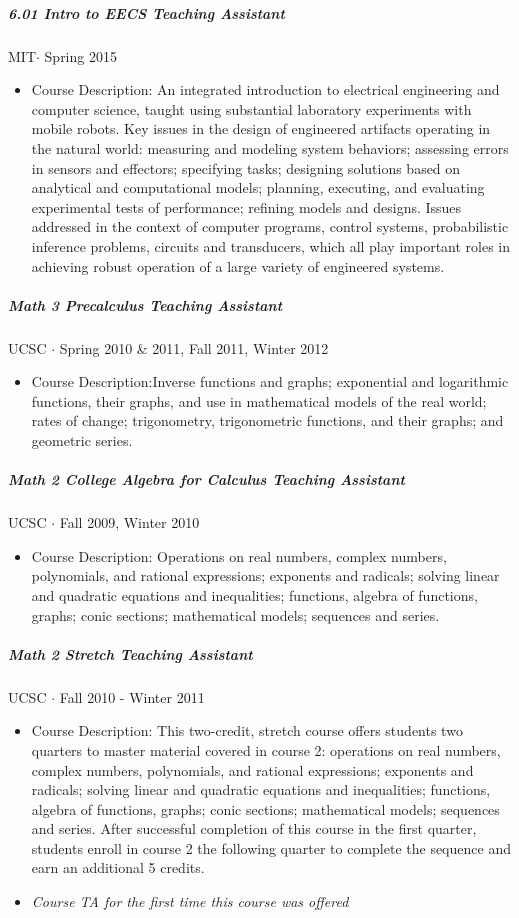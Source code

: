 \documentclass[10pt,letterpaper]{article}
\begin{document}
\subparagraph{6.01 Intro to EECS Teaching Assistant}
MIT$\cdot$ Spring 2015
\begin{itemize}
\item Course Description: An integrated introduction to electrical engineering and computer science, taught using substantial laboratory experiments with mobile robots. Key issues in the design of engineered artifacts operating in the natural world: measuring and modeling system behaviors; assessing errors in sensors and effectors; specifying tasks; designing solutions based on analytical and computational models; planning, executing, and evaluating experimental tests of performance; refining models and designs. Issues addressed in the context of computer programs, control systems, probabilistic inference problems, circuits and transducers, which all play important roles in achieving robust operation of a large variety of engineered systems.
\end{itemize}
\subparagraph{Math 3 Precalculus  Teaching Assistant}
UCSC $\cdot$ Spring 2010 \& 2011, Fall 2011, Winter 2012
\begin{itemize}
\item Course Description:Inverse functions and graphs; exponential and logarithmic functions, their graphs, and use in mathematical models of the real world; rates of change; trigonometry, trigonometric functions, and their graphs; and geometric series. 
\end{itemize}

\subparagraph{Math 2  College Algebra for Calculus Teaching Assistant}
UCSC $\cdot$ Fall 2009, Winter 2010
\begin{itemize}
\item Course Description: Operations on real numbers, complex numbers, polynomials, and rational expressions; exponents and radicals; solving linear and quadratic equations and inequalities; functions, algebra of functions, graphs; conic sections; mathematical models; sequences and series.
\end{itemize}


\subparagraph{Math 2 Stretch Teaching Assistant}
UCSC $\cdot$ Fall 2010 - Winter 2011
\begin{itemize}
\item Course Description: This two-credit, stretch course offers students two quarters to master material covered in course 2: operations on real numbers, complex numbers, polynomials, and rational expressions; exponents and radicals; solving linear and quadratic equations and inequalities; functions, algebra of functions, graphs; conic sections; mathematical models; sequences and series. After successful completion of this course in the first quarter, students enroll in course 2 the following quarter to complete the sequence and earn an additional 5 credits.
\item {\em Course TA for the first time this course was offered}
\end{itemize}
\end{document}
